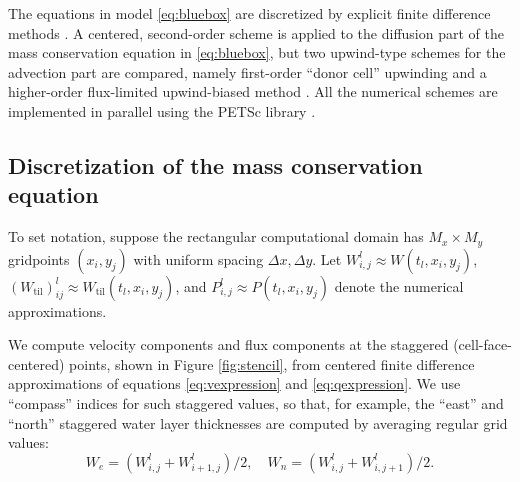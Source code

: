 \documentclass[gmd]{copernicus}   %
\newcommand{\text}{\textrm}
\newcommand{\Wtil}{W_{\text{til}}}
\newcommand{\Wlij}{W^l_{i,j}}
\newcommand{\Plij}{P^l_{i,j}}
\begin{document}
The equations in model \eqref{eq:bluebox} are discretized by explicit finite difference methods \citep{MortonMayers}.   A centered, second-order scheme is applied to the diffusion part of the mass conservation equation in \eqref{eq:bluebox}, but two upwind-type schemes for the advection part are compared, namely first-order ``donor cell'' upwinding \citep{LeVeque} and a higher-order flux-limited upwind-biased method \citep{HundsdorferVerwer2010}.  All the numerical schemes are implemented in parallel using the PETSc library \citep{petsc-user-ref}.

\subsection{Discretization of the mass conservation equation}  \label{subsec:Wfd}  To set notation, suppose the rectangular computational domain has $M_x \times M_y$ gridpoints $(x_i,y_j)$ with uniform spacing $\Delta x,\Delta y$.  Let $\Wlij \approx W(t_l,x_i,y_j)$, $(\Wtil)_{ij}^l \approx \Wtil(t_l,x_i,y_j)$, and $\Plij \approx P(t_l,x_i,y_j)$ denote the numerical approximations.

We compute velocity components and flux components at the staggered (cell-face-centered) points, shown in Figure \ref{fig:stencil}, from centered finite difference approximations of equations \eqref{eq:vexpression} and \eqref{eq:qexpression}.  We use ``compass'' indices for such staggered values, so that, for example, the ``east'' and ``north'' staggered water layer thicknesses are computed by averaging regular grid values:
\begin{equation}
W_e = (W_{i,j}^l + W_{i+1,j}^l)/2, \quad W_n = (W_{i,j}^l + W_{i,j+1}^l)/2. \label{eq:stagW}
\end{equation}
\end{document}
